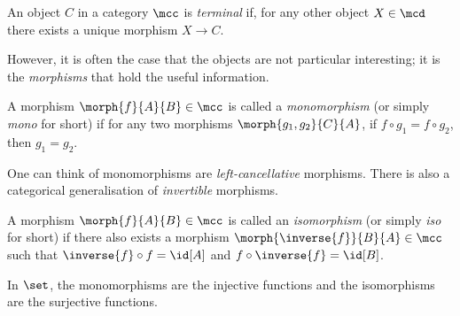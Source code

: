\begin{definition}
    An object \(C\) in a category \(\mcc\) is \emph{terminal} if, for any other
    object \(X \in \mcd\) there exists a unique morphism \(X \to C\).
\end{definition}

However, it is often the case that the objects are not particular interesting;
it is the \emph{morphisms} that hold the useful information.

\begin{definition}[Monomorphism]
    A morphism \(\morph{f}{A}{B} \in \mcc\) is called a \emph{monomorphism} (or
    simply \emph{mono} for short) if for any two morphisms
    \(\morph{g_1,g_2}{C}{A}\), if \(f \circ g_1 = f \circ g_2\), then
    \(g_1 = g_2\).
\end{definition}

One can think of monomorphisms are \emph{left-cancellative} morphisms.
There is also a categorical generalisation of \emph{invertible} morphisms.

\begin{definition}[Isomorphism]
    A morphism \(\morph{f}{A}{B} \in \mcc\) is called an \emph{isomorphism} (or
    simply \emph{iso} for short) if there also exists a morphism \(
        \morph{\inverse{f}}{B}{A} \in \mcc
    \) such that \(
        \inverse{f} \circ f = \id[A]
    \) and \(
        f \circ \inverse{f} = \id[B]
    \).
\end{definition}

\begin{example}
    In \(\set\), the monomorphisms are the injective functions and the
    isomorphisms are the surjective functions.
\end{example}
